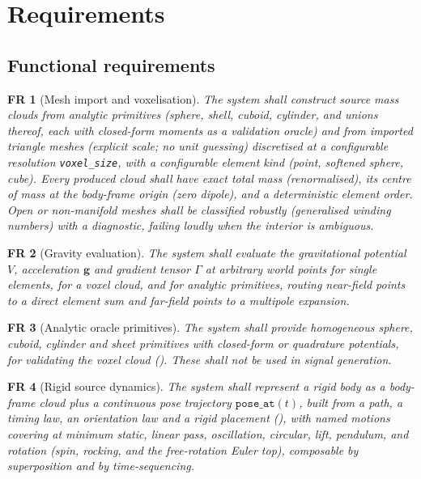 \documentclass[11pt,a4paper]{article}
\theoremstyle{reqstyle}
\newtheorem{freq}{FR}
\begin{document}
\section{Requirements}
\label{sec:req}

\subsection{Functional requirements}

\begin{freq}[Mesh import and voxelisation]
The system shall construct source mass clouds from analytic primitives (sphere, shell, cuboid,
cylinder, and unions thereof, each with closed-form moments as a validation oracle) and from
imported triangle meshes (explicit scale; no unit guessing) discretised at a configurable
resolution \texttt{voxel\_size}, with a configurable element kind (point, softened sphere, cube).
Every produced cloud shall have exact total mass (renormalised), its centre of mass at the
body-frame origin (zero dipole), and a deterministic element order. Open or non-manifold meshes
shall be classified robustly (generalised winding numbers) with a diagnostic, failing loudly when
the interior is ambiguous.
\end{freq}

\begin{freq}[Gravity evaluation]
The system shall evaluate the gravitational potential $V$, acceleration $\mathbf g$ and
gradient tensor $\Gamma$ at arbitrary world points for single elements, for a voxel cloud,
and for analytic primitives, routing near-field points to a direct element sum and
far-field points to a multipole expansion.
\end{freq}

\begin{freq}[Analytic oracle primitives]
The system shall provide homogeneous sphere, cuboid, cylinder and sheet primitives with
closed-form or quadrature potentials, for validating the voxel cloud ().
These shall not be used in signal generation.
\end{freq}

\begin{freq}[Rigid source dynamics]
The system shall represent a rigid body as a body-frame cloud plus a continuous pose
trajectory $\texttt{pose\_at}(t)$, built from a path, a timing law, an orientation law and a
rigid placement (), with named motions covering at minimum static, linear
pass, oscillation, circular, lift, pendulum, and rotation (spin, rocking, and the free-rotation
Euler top), composable by superposition and by time-sequencing.
\end{freq}
\end{document}
